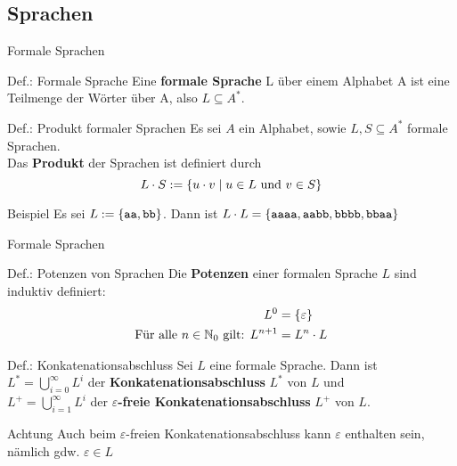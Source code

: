 \subsection{Sprachen} %
\begin{frame}{Formale Sprachen}
	\begin{block}{Def.: Formale Sprache}
		Eine \textbf{formale Sprache} L über einem Alphabet A ist eine Teilmenge der Wörter über A, also \(L \subseteq A^{*}\).
	\end{block}

	\begin{block}{Def.: Produkt formaler Sprachen}
		Es sei $A$ ein Alphabet, sowie $L,S \subseteq A^*$ formale Sprachen.\\
		Das \textbf{Produkt} der Sprachen ist definiert durch
		\[
			L \cdot S := \left\{ u \cdot v \mid u \in L \text{ und } v \in S \right\}
		\]
	\end{block}

	\begin{exampleblock}{Beispiel}
		Es sei $L:=\left\{ \texttt{aa}, \texttt{bb} \right\}$. Dann ist $L\cdot L = \left\{ \texttt{aaaa}, \texttt{aabb}, \texttt{bbbb}, \texttt{bbaa} \right\}$
	\end{exampleblock}
\end{frame}

\begin{frame}{Formale Sprachen}
	\begin{block}{Def.: Potenzen von Sprachen}
		Die \textbf{Potenzen} einer formalen Sprache $L$ sind induktiv definiert:
		\begin{align*}
			L^0 &= \left\{ \varepsilon \right\} \\
			\text{Für alle $n \in \mathbb{N}_0$ gilt: } L^{n+1} &= L^n \cdot L
		\end{align*}
	\end{block}

	\begin{block}{Def.: Konkatenationsabschluss}
		Sei $L$ eine formale Sprache. Dann ist \\
		$L^* = \bigcup_{i=0}^{\infty} L^{i}$ der \textbf{Konkatenationsabschluss} $L^*$ von $L$ und \\
		$L^+ = \bigcup_{i=1}^{\infty} L^{i}$ der \textbf{$\varepsilon$-freie Konkatenationsabschluss} $L^+$ von $L$.
	\end{block}

	\begin{alertblock}{Achtung}
		Auch beim $\varepsilon$-freien Konkatenationsabschluss kann $\varepsilon$ enthalten sein, nämlich gdw. $\varepsilon \in L$
	\end{alertblock}
\end{frame}

